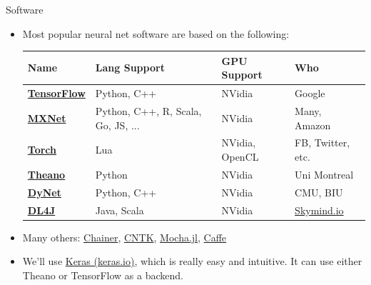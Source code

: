 \documentclass[xcolor=pdftex,x11names,table,hyperref]{beamer}
\begin{document}
\begin{frame}{Software}
\begin{itemize}
	\item Most popular neural net software are based on the following: \\[1.0em]
\hspace*{-4.0em}%
\begin{tabular}{llll}
	\bf Name & \bf Lang Support & \bf GPU Support & \bf Who \\
	\hline
	\bf \href{https://www.tensorflow.org}{TensorFlow} & Python, C++ & NVidia & Google \\
	\bf \href{https://github.com/dmlc/mxnet}{MXNet} & \tiny{Python, C++, R, Scala, Go, JS, ...} & NVidia & Many, Amazon \\
	\bf \href{http://torch.ch}{Torch} & Lua & NVidia, OpenCL & FB, Twitter, etc. \\
	\bf \href{http://www.deeplearning.net/software/theano}{Theano} & Python & NVidia & Uni Montreal \\
	\bf \href{https://github.com/clab/dynet}{DyNet} & Python, C++ & NVidia & CMU, BIU \\
	\bf \href{http://deeplearning4j.org}{DL4J} & Java, Scala & NVidia & \href{http://skymind.io}{Skymind.io} \\
\end{tabular}
\vspace*{1.0em}
\pause
\item Many others: \href{http://chainer.org}{Chainer}, \href{https://github.com/Microsoft/CNTK}{CNTK}, \href{https://github.com/pluskid/Mocha.jl}{Mocha.jl}, \href{http://caffe.berkeleyvision.org}{Caffe}
\pause
\item We'll use \href{http://keras.io}{Keras (keras.io)}, which is really easy and intuitive.  It can use either Theano or TensorFlow as a backend.
\end{itemize}
\end{frame}

\end{document}
